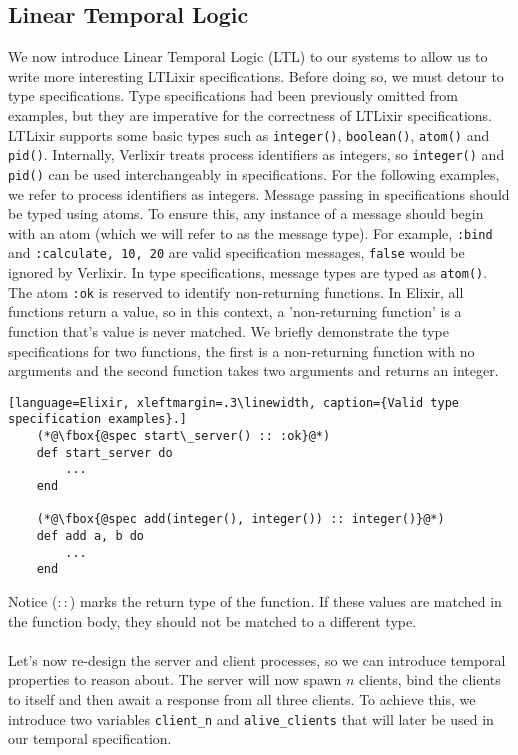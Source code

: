 \subsection{Linear Temporal Logic}
We now introduce Linear Temporal Logic (LTL) to our systems to allow us to write more interesting LTLixir specifications. Before doing so, we must detour to type specifications. Type specifications had been previously omitted from examples, but they are imperative for the correctness of LTLixir specifications. LTLixir supports some basic types such as \texttt{integer()}, \texttt{boolean()}, \texttt{atom()} and \texttt{pid()}. Internally, Verlixir treats process identifiers as integers, so \texttt{integer()} and \texttt{pid()} can be used interchangeably in specifications. For the following examples, we refer to process identifiers as integers. Message passing in specifications should be typed using atoms. To ensure this, any instance of a message should begin with an atom (which we will refer to as the message type). For example, \texttt{{:bind}} and \texttt{{:calculate, 10, 20}} are valid specification messages, \texttt{{false}} would be ignored by Verlixir. In type specifications, message types are typed as \texttt{atom()}. The atom \texttt{:ok} is reserved to identify non-returning functions. In Elixir, all functions return a value, so in this context, a 'non-returning function' is a function that's value is never matched. We briefly demonstrate the type specifications for two functions, the first is a non-returning function with no arguments and the second function takes two arguments and returns an integer.
\begin{lstlisting}[language=Elixir, xleftmargin=.3\linewidth, caption={Valid type specification examples}.]
    (*@\fbox{@spec start\_server() :: :ok}@*)
    def start_server do
        ...
    end

    (*@\fbox{@spec add(integer(), integer()) :: integer()}@*)
    def add a, b do
        ...
    end
\end{lstlisting}
Notice ($::$) marks the return type of the function. If these values are matched in the function body, they should not be matched to a different type.
\\ \\
Let's now re-design the server and client processes, so we can introduce temporal properties to reason about. The server will now spawn $n$ clients, bind the clients to itself and then await a response from all three clients. To achieve this, we introduce two variables \texttt{client\_n} and \texttt{alive\_clients} that will later be used in our temporal specification.
